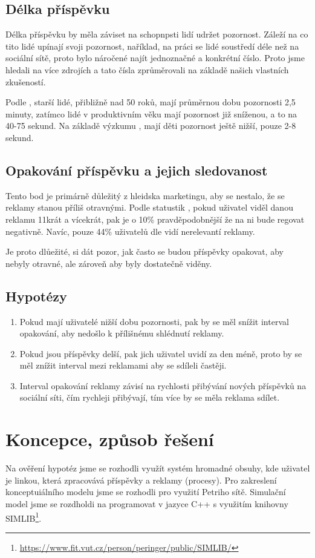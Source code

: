 \documentclass[11pt, a4paper]{article}
\begin{document}
\subsection{Délka příspěvku}
Délka příspěvku by měla záviset na schopnpsti lidí udržet pozornost. Záleží na co tito lidé upínají svoji pozornost,
naříklad, na práci se lidé soustředí déle než na sociální sítě, proto bylo náročené najít jednoznačné a konkrétní číslo.
Proto jsme hledali na více zdrojích a tato čísla zprůměrovali na základě našich vlastních zkušeností.

Podle \cite{AttentionSpan1}, starší lidé, přibližně nad 50 roků, mají průměrnou dobu pozornosti 2,5 minuty, zatímco lidé v produktivním věku mají pozornost již sníženou, a to na 40-75 sekund.
Na základě výzkumu \cite{AttentionSpan2}, mají děti pozornost ještě nižší, pouze 2-8 sekund.

\subsection{Opakování příspěvku a jejich sledovanost}
Tento bod je primárně důležitý z hleidska marketingu, aby se nestalo, že se reklamy stanou příliš otravnými.
Podle statustik \cite{SocialMediaAds}, pokud uživatel viděl danou reklamu 11krát a vícekrát, pak je o 10\% pravděpodobnější že na ni bude regovat negativně.
Navíc, pouze 44\% uživatelů dle \cite{SocialMediaAds-44} vidí nerelevantí reklamy. 

Je proto dlůežité, si dát pozor, jak často se budou příspěvky opakovat, aby nebyly otravné, ale zároveň aby byly dostatečně viděny.

\subsection{Hypotézy}
\begin{enumerate}
    \item Pokud mají uživatelé nižší dobu pozornosti, pak by se měl snížit interval opakování, aby nedošlo k přílišnému shlédnutí reklamy.
    \item Pokud jsou příspěvky delší, pak jich uživatel uvidí za den méně, proto by se měl znížit interval mezi reklamami aby se sdíleli častěji.
    \item Interval opakování reklamy závisí na rychlosti přibývání nových příspěvků na sociální síti, čím rychleji přibývají, tím více by se měla reklama sdílet.
\end{enumerate}

\newpage
\section{Koncepce, způsob řešení}
Na ověření hypotéz jsme se rozhodli využít systém hromadné obsuhy, kde uživatel je linkou, která zpracovává příspěvky a reklamy (procesy).
Pro zakreslení konceptuiálního modelu jsme se rozhodli pro využití Petriho sítě. Simulační model jsme se rozdholdi na programovat v jazyce C++ s využitím knihovny SIMLIB\footnote{\href{https://www.fit.vut.cz/person/peringer/public/SIMLIB/}{https://www.fit.vut.cz/person/peringer/public/SIMLIB/}}.
\end{document}
